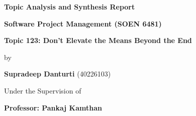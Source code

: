 \begin{titlepage}
\clearpage
\vspace*{\fill}
\begin{center}
    \centering
     
      
  {{\Large \textbf{Topic Analysis and Synthesis Report}\par}}
    \vspace{1cm}%
     
    \vspace{0.4cm}
    {
    \textbf{\large Software Project Management (SOEN 6481)} \par}
    \vspace{0.2cm}


\vspace{0.5cm}
    {
    \textbf{\large Topic 123: Don't Elevate the Means Beyond the End} \par}
    \vspace{2mm}


    

\vspace{5mm}
    {\large by\par}
    \vspace{0.05cm}
    {\small {\textbf{Supradeep Danturti}}  (40226103)\par}

    \vspace{0.9cm}
    
    { Under the Supervision of \par}
    {\small \textbf{\textbf{Professor:{ Pankaj Kamthan}}}\par}


\end{center}
\end{titlepage}
